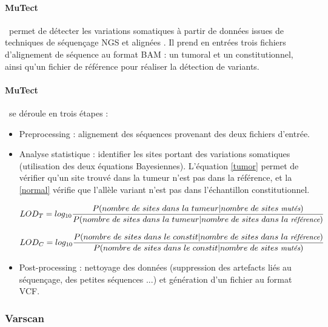 \paragraph*{MuTect} ~permet de détecter les variations somatiques à partir de données issues de techniques de séquençage NGS et alignées \citep{Mutect}. Il prend en entrées trois fichiers d'alignement de séquence au format BAM : un tumoral et un constitutionnel, ainsi qu'un fichier de référence pour réaliser la détection de variants. 

\paragraph*{MuTect} ~se déroule en trois étapes :
\begin{itemize}
\item Preprocessing : alignement des séquences provenant des deux fichiers d'entrée.
\item Analyse statistique : identifier les sites portant des variations somatiques (utilisation des deux équations Bayesiennes). L'équation \ref{tumor} permet de vérifier qu'un site trouvé dans la tumeur n'est pas dans la référence, et la \ref{normal} vérifie que l'allèle variant n'est pas dans l'échantillon constitutionnel.

\begin{equation}\label{tumor}
\small LOD_{T} = log_{10} \frac{P(nombre ~de ~sites ~dans ~la ~tumeur|nombre ~de ~sites ~\textit{mutés})}{P(nombre ~de ~sites ~dans ~la ~tumeur | nombre ~de ~sites ~dans ~la ~\textit{référence})}
\end{equation}

\begin{equation}\label{normal}
\small LOD_{C} = log_{10} \frac{P(nombre ~de ~sites ~dans ~le ~constit|nombre ~de ~sites ~dans ~la ~\textit{référence})}{P(nombre ~de ~sites ~dans ~le ~constit | nombre ~de ~sites ~\textit{mutés})}
\end{equation}

\item Post-processing : nettoyage des données (suppression des artefacts liés au séquençage, des petites séquences ...) et génération d'un fichier au format VCF.
\end{itemize}

\subsubsection{Varscan}\label{subsec:varscan}

